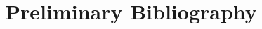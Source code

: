 \documentclass{article}
\begin{document}
%
\section{Preliminary Bibliography}
\setlength{\parskip}{-.15in} 

\renewcommand{\refname}{} %

\nocite{mm2} %



\end{document}
